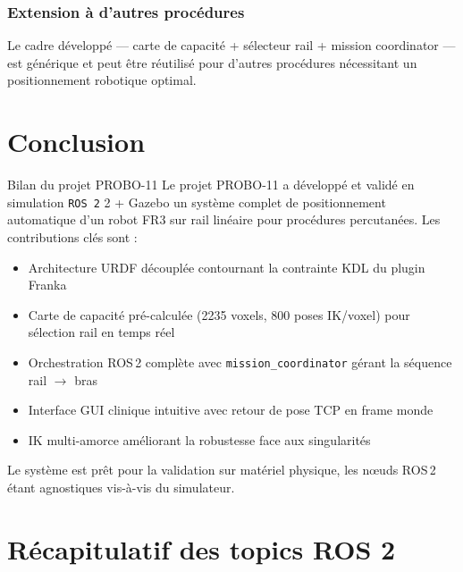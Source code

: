 \documentclass[11pt, a4paper]{article}
\newcommand{\ros}{\texttt{ROS\,2}}
\begin{document}
\subsubsection{Extension à d'autres procédures}

Le cadre développé — carte de capacité + sélecteur rail + mission coordinator — est générique et peut être réutilisé pour d'autres procédures nécessitant un positionnement robotique optimal.

\section*{Conclusion}

\begin{keybox}{Bilan du projet PROBO-11}
Le projet PROBO-11 a développé et validé en simulation \ros{} 2 + Gazebo un système complet de positionnement automatique d'un robot FR3 sur rail linéaire pour procédures percutanées. Les contributions clés sont :

\begin{itemize}[leftmargin=1em, itemsep=3pt]
  \item Architecture URDF découplée contournant la contrainte KDL du plugin Franka
  \item Carte de capacité pré-calculée (2235 voxels, 800 poses IK/voxel) pour sélection rail en temps réel
  \item Orchestration ROS\,2 complète avec \texttt{mission\_coordinator} gérant la séquence rail $\to$ bras
  \item Interface GUI clinique intuitive avec retour de pose TCP en frame monde
  \item IK multi-amorce améliorant la robustesse face aux singularités
\end{itemize}

Le système est prêt pour la validation sur matériel physique, les nœuds ROS\,2 étant agnostiques vis-à-vis du simulateur.
\end{keybox}

\vspace{1cm}

\appendix
\section{Récapitulatif des topics ROS 2}
\end{document}
